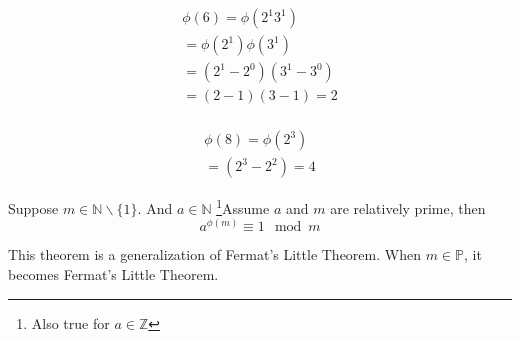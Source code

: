 \documentclass[10pt]{article}
\begin{document}
	\begin{example}
		\begin{gather*}
			\phi(6) = \phi(2^1 3^1) \\
			= \phi(2^1) \phi(3^1) \\
			= (2^1 - 2^0) (3^1 - 3^0) \\
			= (2 - 1)(3 - 1)
			= 2 \\
		\end{gather*}
	\end{example}
	\begin{example}
		\begin{gather*}
			\phi(8) = \phi(2^3)\\
			= (2^3 - 2^2) = 4
		\end{gather*}
	\end{example}
	
	\begin{theorem}
		Suppose $m \in \mathbb{N} \backslash \{1\}$. And $a \in \mathbb{N}$ \footnote{Also true for $a \in \mathbb{Z}$}Assume $a$ and $m$ are relatively prime, then 
		\[
			a^{\phi(m)} \equiv 1 \mod m
		\]
	\end{theorem}
	
	\begin{remark}
		This theorem is a generalization of Fermat's Little Theorem. When $m \in \mathbb{P}$, it becomes Fermat's Little Theorem.
	\end{remark}
	
\end{document}
